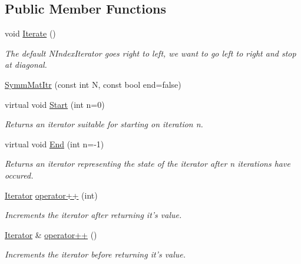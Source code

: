 \subsection*{Public Member Functions}
\begin{DoxyCompactItemize}
\item 
void \hyperlink{classJKBuilder_1_1SymmMatItr_a7874a07e98b52f4f147cde6f39353bae}{Iterate} ()
\begin{DoxyCompactList}\small\item\em The default NIndexIterator goes right to left, we want to go left to right and stop at diagonal. \item\end{DoxyCompactList}\item 
\hyperlink{classJKBuilder_1_1SymmMatItr_a5b2e8dde1f98a28e0e22b9fc4e911376}{SymmMatItr} (const int N, const bool end=false)
\item 
virtual void \hyperlink{classJKBuilder_1_1Iterator_a34ca36a99b20ae3170babadaffe51ed2}{Start} (int n=0)
\begin{DoxyCompactList}\small\item\em Returns an iterator suitable for starting on iteration n. \item\end{DoxyCompactList}\item 
virtual void \hyperlink{classJKBuilder_1_1Iterator_a5f692b73d2e160450f4617bb75825e11}{End} (int n=-\/1)
\begin{DoxyCompactList}\small\item\em Returns an iterator representing the state of the iterator after n iterations have occured. \item\end{DoxyCompactList}\item 
\hyperlink{classJKBuilder_1_1Iterator}{Iterator} \hyperlink{classJKBuilder_1_1Iterator_ac1702aedba13b4112b891b58dfd78eba}{operator++} (int)
\begin{DoxyCompactList}\small\item\em Increments the iterator after returning it's value. \item\end{DoxyCompactList}\item 
\hyperlink{classJKBuilder_1_1Iterator}{Iterator} \& \hyperlink{classJKBuilder_1_1Iterator_ae1f21c74128a5ef5d1b9de72ceb09be8}{operator++} ()
\begin{DoxyCompactList}\small\item\em Increments the iterator before returning it's value. \item\end{DoxyCompactList}\item 

\end{DoxyCompactItemize}
